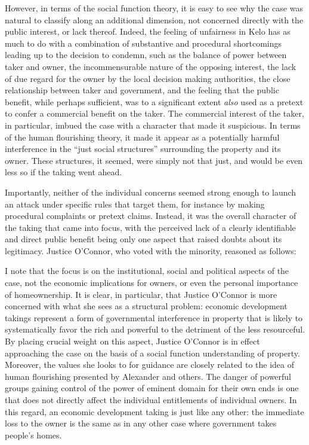 However, in terms of the social function theory, it is easy to see why the case was natural to classify along an additional dimension, not concerned directly with the public interest, or lack thereof. Indeed, the feeling of unfairness in Kelo has as much to do with a combination of substantive and procedural shortcomings leading up to the decision to condemn, such as the balance of power between taker and owner, the incommensurable nature of the opposing interest, the lack of due regard for the owner by the local decision making authorities, the close relationship between taker and government, and the feeling that the public benefit, while perhaps sufficient, was to a significant extent {\it also} used as a pretext to confer a commercial benefit on the taker. The commercial interest of the taker, in particular, imbued the case with a character that made it suspicious. In terms of the human flourishing theory, it made it appear as a potentially harmful interference in the ``just social structures'' surrounding the property and its owner. These structures, it seemed, were simply not that just, and would be even less so if the taking went ahead. 

Importantly, neither of the individual concerns seemed strong enough to launch an attack under specific rules that target them, for instance by making procedural complaints or pretext claims. Instead, it was the overall character of the taking that came into focus, with the perceived lack of a clearly identifiable and direct public benefit being only one aspect that raised doubts about its legitimacy. 
Justice O'Connor, who voted with the minority, reasoned as follows:

\begin{quote}

\end{quote}

I note that the focus is on the institutional, social and political aspects of the case, not the economic implications for owners, or even the personal importance of homeownership. It is clear, in particular, that Justice O'Connor is more concerned with what she sees as a structural problem: economic development takings represent a form of governmental interference in property that is likely to systematically favor the rich and powerful to the detriment of the less resourceful. By placing crucial weight on this aspect, Justice O'Connor is in effect approaching the case on the basis of a social function understanding of property. Moreover, the values she looks to for guidance are closely related to the idea of human flourishing presented by Alexander and others. The danger of powerful groups gaining control of the power of eminent domain for their own ends is one that does not directly affect the individual entitlements of individual owners. In this regard, an economic development taking is just like any other: the immediate loss to the owner is the same as in any other case where government takes people's homes. 

